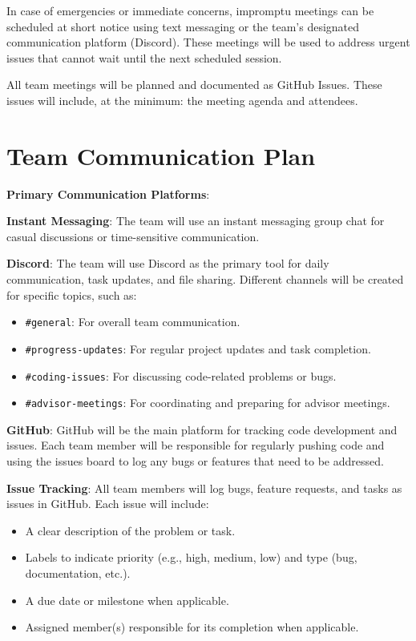 \documentclass{article}
\begin{document}
In case of emergencies or immediate concerns, impromptu meetings can be scheduled at short notice using text messaging or the team’s designated communication platform (Discord). These meetings will be used to address urgent issues that cannot wait until the next scheduled session. 

All team meetings will be planned and documented as GitHub Issues. These issues will include, at the minimum: the meeting agenda and attendees.

\section{Team Communication Plan}
\textbf{Primary Communication Platforms}:
\begin{flushleft}
  \textbf{Instant Messaging}: The team will use an instant messaging group chat for casual discussions or time-sensitive communication.
\end{flushleft}

\textbf{Discord}: The team will use Discord as the primary tool for daily communication, task updates, and file sharing. Different channels will be created for specific topics, such as:

\begin{itemize}
    \item \texttt{\#general}: For overall team communication.
    \item \texttt{\#progress-updates}: For regular project updates and task completion.
    \item \texttt{\#coding-issues}: For discussing code-related problems or bugs.
    \item \texttt{\#advisor-meetings}: For coordinating and preparing for advisor meetings.
\end{itemize}

\textbf{GitHub}: GitHub will be the main platform for tracking code development and issues. Each team member will be responsible for regularly pushing code and using the issues board to log any bugs or features that need to be addressed.

\textbf{Issue Tracking}: All team members will log bugs, feature requests, and tasks as issues in GitHub. Each issue will include:
\begin{itemize}
    \item A clear description of the problem or task.
    \item Labels to indicate priority (e.g., high, medium, low) and type (bug, documentation, etc.).
    \item A due date or milestone when applicable.
    \item Assigned member(s) responsible for its completion when applicable.
\end{itemize}
\end{document}
